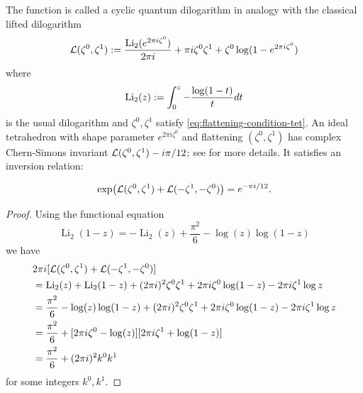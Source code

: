 \documentclass{sl2ams}
\numberwithin{equation}{section}
\begin{document}
The function is called a cyclic quantum dilogarithm in analogy with the classical lifted dilogarithm
\begin{equation}
  \label{eq:dilr-classical}
  \mathcal{L}(\zeta^0, \zeta^1)
  \mathrel{:=}
  \frac{\operatorname{Li}_2(e^{2\pi i \zeta^0})}{2\pi i} + \pi i \zeta^0 \zeta^1 + \zeta^0 \log(1 - e^{2\pi i \zeta^0})
\end{equation}
where
\begin{equation}
  \operatorname{Li}_2(z)
  \mathrel{:=}
  \int_{0}^{z} - \frac{\log(1 -t)}{t}dt
\end{equation}
is the usual dilogarithm and \(\zeta^0, \zeta^1\) satisfy \eqref{eq:flattening-condition-tet}.
An ideal tetrahedron with shape parameter \(e^{2\pi i \zeta^0}\) and flattening \((\zeta^0, \zeta^1)\) has complex Chern-Simons invariant \(\mathcal{L}(\zeta^0, \zeta^1) - i \pi / 12\); see \cite{McPhailSnyderVolume} for more details.
It satisfies an inversion relation:

\begin{lemma}
  \label{thm:dilog-inversion-classical}
  \[
    \exp \mathopen{}\left( \mathcal{L}(\zeta^0, \zeta^1) + \mathcal{L}(-\zeta^1, -\zeta^0) \right) = e^{-\pi i /12}
    .
    \qedhere
  \]
\end{lemma}

\begin{proof}
  Using the functional equation \cite{Zagier2007}   
  \[
    \operatorname{Li}_{2}(1 - z)
    =
    -\operatorname{Li}_{2}(z)
    + \frac{\pi^{2}}{6}
    - \log(z) \log(1-z)
  \]
  we have
  \begin{align*}
  &2 \pi i[
    \mathcal{L}(\zeta^0, \zeta^1) + \mathcal{L}(-\zeta^1, -\zeta^0)
  ]
  \\
  &=
  \operatorname{Li}_{2}(z)
  +
  \operatorname{Li}_{2}(1-z)
  +
  (2 \pi i)^{2} \zeta^{0} \zeta^{1}
  +
  2 \pi i \zeta^{0} \log(1 - z)
  -
  2 \pi i \zeta^{1} \log z
  \\
  &=
  \frac{ \pi^{2} }{ 6 }
  -
  \log(z) \log(1-z) 
  +
  (2 \pi i)^{2} \zeta^{0} \zeta^{1}
  +
  2 \pi i \zeta^{0} \log(1 - z)
  -
  2 \pi i \zeta^{1} \log z
  \\
  &=
  \frac{ \pi^{2} }{ 6 }
  +
  [2 \pi i \zeta^{0} - \log (z) ]
  [2 \pi i \zeta^{1} + \log(1-z)]
  \\
  &=
  \frac{ \pi^{2} }{ 6 }
  +
  (2 \pi i)^{2} k^{0} k^{1}
  \end{align*}
  for some integers \(k^{0}, k^{1}\).
\end{proof}
\end{document}
